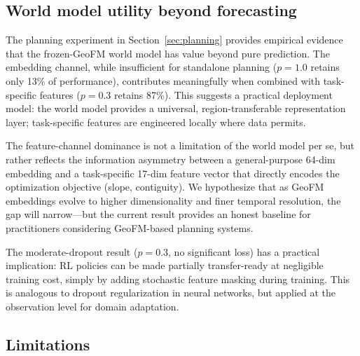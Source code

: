 \documentclass{article}
\begin{document}
\subsection{World model utility beyond forecasting}

The planning experiment in Section~\ref{sec:planning} provides empirical evidence that the frozen-GeoFM world model has value beyond pure prediction. The embedding channel, while insufficient for standalone planning ($p=1.0$ retains only 13\% of performance), contributes meaningfully when combined with task-specific features ($p=0.3$ retains 87\%). This suggests a practical deployment model: the world model provides a universal, region-transferable representation layer; task-specific features are engineered locally where data permits.

The feature-channel dominance is not a limitation of the world model per se, but rather reflects the information asymmetry between a general-purpose 64-dim embedding and a task-specific 17-dim feature vector that directly encodes the optimization objective (slope, contiguity). We hypothesize that as GeoFM embeddings evolve to higher dimensionality and finer temporal resolution, the gap will narrow---but the current result provides an honest baseline for practitioners considering GeoFM-based planning systems.

The moderate-dropout result ($p=0.3$, no significant loss) has a practical implication: RL policies can be made partially transfer-ready at negligible training cost, simply by adding stochastic feature masking during training. This is analogous to dropout regularization in neural networks, but applied at the observation level for domain adaptation.

\subsection{Limitations}
\end{document}
